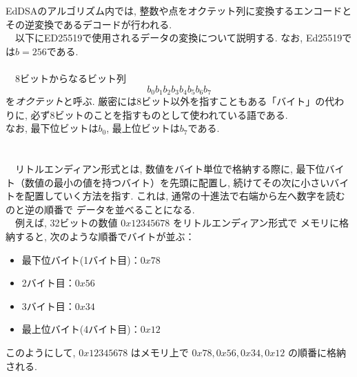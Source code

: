 EdDSAのアルゴリズム内では, 整数や点をオクテット列に変換するエンコードと
その逆変換であるデコードが行われる\cite{インフォーズ}.\\
　以下にED25519で使用されるデータの変換について説明する.
なお, Ed25519では$b=256$である.\\


\\
　8ビットからなるビット列
\[
b_0b_1b_2b_3b_4b_5b_6b_7
\]
を\emph{オクテット}と呼ぶ.
厳密には8ビット以外を指すこともある「バイト」の代わりに, 
必ず8ビットのことを指すものとして使われている語である.\\
なお, 最下位ビットは$b_0$, 最上位ビットは$b_7$である.\\[1em]
\\[1em]

\\
　リトルエンディアン形式とは, 数値をバイト単位で格納する際に, 
最下位バイト（数値の最小の値を持つバイト）を先頭に配置し, 
続けてその次に小さいバイトを配置していく方法を指す.
これは, 通常の十進法で右端から左へ数字を読むのと逆の順番で
データを並べることになる.\\
　例えば, 32ビットの数値 $0x12345678$ をリトルエンディアン形式で
メモリに格納すると, 次のような順番でバイトが並ぶ：
\begin{itemize}
  \item 最下位バイト(1バイト目)：$0x78$
  \item 2バイト目：$0x56$
  \item 3バイト目：$0x34$
  \item 最上位バイト(4バイト目)：$0x12$
\end{itemize}
\noindent このようにして, $0x12345678$ はメモリ上で 
$0x78, 0x56, 0x34, 0x12$ の順番に格納される.\\[1em]

